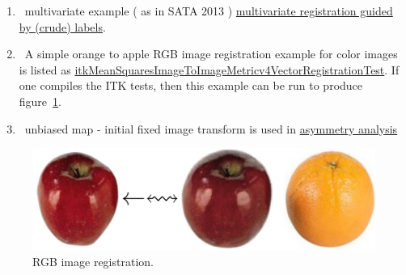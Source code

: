 \documentclass{frontiersSCNS}
\begin{document}
\begin{enumerate}
  \item~multivariate example ( as in SATA 2013 ) \href{http://stnava.github.io/LabelMyHeart/}{multivariate
    registration guided by (crude) labels}.

 \item~A simple orange to apple RGB image registration example for
   color images is listed as
   \href{https://github.com/Kitware/ITK/blob/master/Modules/Registration/Metricsv4/test/CMakeLists.txt}{itkMeanSquaresImageToImageMetricv4VectorRegistrationTest}.
   If one compiles the ITK tests, then this example can be run to
   produce figure~\ref{fig:appleorange}.

   \item~unbiased map - initial fixed image transform is used in \href{http://stnava.github.io/asymmetry/}{asymmetry analysis}



\end{enumerate}

\begin{figure}[t]
\begin{center}
\includegraphics[width=6.5in]{figs/appleorange.pdf}
\caption{\baselineskip 12pt \small RGB image registration.}
\label{fig:appleorange}
\end{center}
\end{figure}
\end{document}
